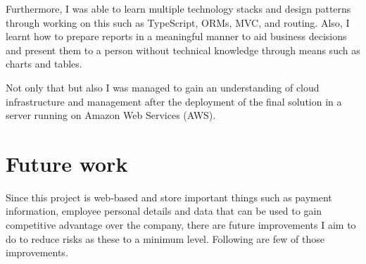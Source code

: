 \documentclass[12pt]{report}
\begin{document}
Furthermore, I was able to learn multiple technology stacks and design patterns through working on this such as TypeScript, ORMs, MVC, and routing. Also, I learnt how to prepare reports in a meaningful manner to aid business decisions and present them to a person without technical knowledge through means such as charts and tables.

Not only that but also I was managed to gain an understanding of cloud infrastructure and management after the deployment of the final solution in a server running on Amazon Web Services (AWS).

\section{Future work}
Since this project is web-based and store important things such as payment information, employee personal details and data that can be used to gain competitive advantage over the company, there are future improvements I aim to do to reduce risks as these to a minimum level. Following are few of those improvements.

\end{document}
